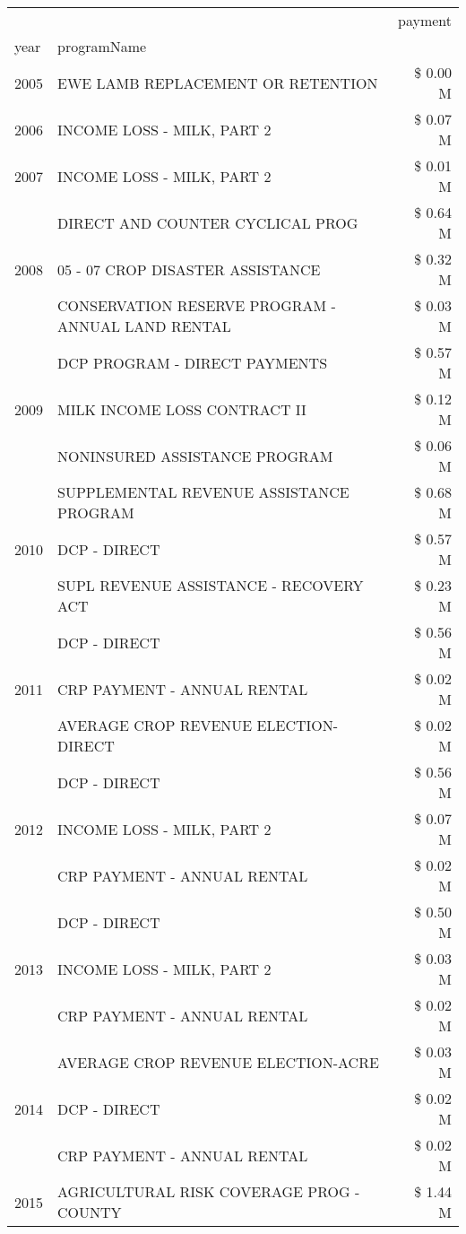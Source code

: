 \begin{tabular}{llr}
\toprule
 &  & payment \\
year & programName &  \\
\midrule
2005 & EWE LAMB REPLACEMENT OR RETENTION & \$ 0.00 M \\
\cline{1-3}
2006 & INCOME LOSS - MILK, PART 2 & \$ 0.07 M \\
\cline{1-3}
2007 & INCOME LOSS - MILK, PART 2 & \$ 0.01 M \\
\cline{1-3}
\multirow[t]{3}{*}{2008} & DIRECT AND COUNTER CYCLICAL PROG & \$ 0.64 M \\
 & 05 - 07 CROP DISASTER ASSISTANCE & \$ 0.32 M \\
 & CONSERVATION RESERVE PROGRAM - ANNUAL LAND RENTAL & \$ 0.03 M \\
\cline{1-3}
\multirow[t]{3}{*}{2009} & DCP PROGRAM - DIRECT PAYMENTS & \$ 0.57 M \\
 & MILK INCOME LOSS CONTRACT II & \$ 0.12 M \\
 & NONINSURED ASSISTANCE PROGRAM & \$ 0.06 M \\
\cline{1-3}
\multirow[t]{3}{*}{2010} & SUPPLEMENTAL REVENUE ASSISTANCE PROGRAM & \$ 0.68 M \\
 & DCP - DIRECT & \$ 0.57 M \\
 & SUPL REVENUE ASSISTANCE - RECOVERY ACT & \$ 0.23 M \\
\cline{1-3}
\multirow[t]{3}{*}{2011} & DCP - DIRECT & \$ 0.56 M \\
 & CRP PAYMENT - ANNUAL RENTAL & \$ 0.02 M \\
 & AVERAGE CROP REVENUE ELECTION-DIRECT & \$ 0.02 M \\
\cline{1-3}
\multirow[t]{3}{*}{2012} & DCP - DIRECT & \$ 0.56 M \\
 & INCOME LOSS - MILK, PART 2 & \$ 0.07 M \\
 & CRP PAYMENT - ANNUAL RENTAL & \$ 0.02 M \\
\cline{1-3}
\multirow[t]{3}{*}{2013} & DCP - DIRECT & \$ 0.50 M \\
 & INCOME LOSS - MILK, PART 2 & \$ 0.03 M \\
 & CRP PAYMENT - ANNUAL RENTAL & \$ 0.02 M \\
\cline{1-3}
\multirow[t]{3}{*}{2014} & AVERAGE CROP REVENUE ELECTION-ACRE & \$ 0.03 M \\
 & DCP - DIRECT & \$ 0.02 M \\
 & CRP PAYMENT - ANNUAL RENTAL & \$ 0.02 M \\
\cline{1-3}
\multirow[t]{3}{*}{2015} & AGRICULTURAL RISK COVERAGE PROG - COUNTY & \$ 1.44 M \\

\end{tabular}
